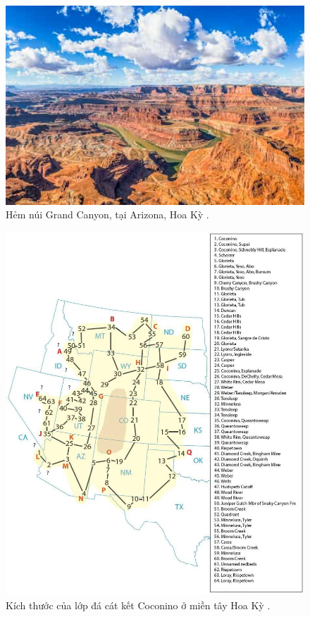 \documentclass[10pt,twocolumn,letterpaper]{article}
\begin{document}
\begin{figure}[b]
\begin{center}
   \includegraphics[width=1\linewidth]{grand-canyon.jpg}
\end{center}
   \caption{Hẻm núi Grand Canyon, tại Arizona, Hoa Kỳ \cite{49}.}
\label{fig:2}
\label{fig:onecol}
\end{figure}

\begin{figure}[t]

\begin{center}
   \includegraphics[width=1\linewidth]{coconino.jpg}
\end{center}
   \caption{Kích thước của lớp đá cát kết Coconino ở miền tây Hoa Kỳ \cite{21}.}
\label{fig:3}
\label{fig:onecol}
\end{figure}
\end{document}

